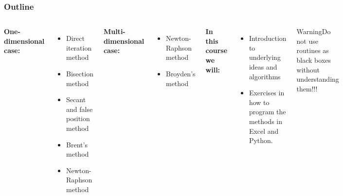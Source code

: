   \begin{frame}[fragile]
    \frametitle{Outline}

      \begin{columns}   
        \textbf{One-dimensional case:}
        \begin{itemize}
          \item Direct iteration method
          \item Bisection method
          \item Secant and false position method
          \item Brent's method
          \item Newton-Raphson method
        \end{itemize}
        \vspace{0.15cm}
        \textbf{Multi-dimensional case:}
        \begin{itemize}
          \item Newton-Raphson method
          \item Broyden's method
        \end{itemize}
        \vspace{0.15cm}
        \textbf{In this course we will:}
        \begin{itemize}
          \item Introduction to underlying ideas and algorithms
          \item Exercises in how to program the methods in Excel and Python.
        \end{itemize}
      \begin{block}{Warning}Do not use routines as black boxes without understanding them!!!\end{block}
      \end{columns}
  \end{frame}
  
